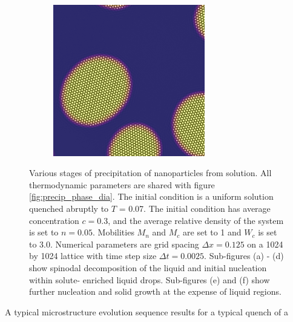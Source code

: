 \documentclass[showkeys, prb, reprint]{revtex4-1}
\begin{document}
\begin{figure}
\begin{subfigure}[b]{0.2\textwidth}
        \label{fig:sacrifical_growth}
        \caption{}
    \end{subfigure}
    ~ 
    \begin{subfigure}[b]{0.2\textwidth}
        \includegraphics[width=\textwidth]{crystalgrowth}
        \label{fig:crystalgrowth}
        \caption{}
    \end{subfigure}
    \caption{
        \label{fig:precipitation}
        Various stages of precipitation of nanoparticles from solution. All
        thermodynamic parameters are shared with figure
        \ref{fig:precip_phase_dia}. The initial condition is a uniform solution
        quenched abruptly to $T$ = 0.07. The initial condition has average
        concentration $c = 0.3$, and the average relative density of the system 
        is set to $n = 0.05$. Mobilities $M_n$ and $M_c$ are set to 1 and $W_c$ is set to 
        3.0. Numerical parameters are grid spacing $\Delta x = 0.125$ on a 1024 by
        1024 lattice with time step size $\Delta t = 0.0025$. Sub-figures (a) -
        (d) show spinodal decomposition of the liquid and initial nucleation within solute-	enriched liquid drops. Sub-figures (e) and (f) show further nucleation and solid 		growth at the expense of liquid regions.   
    }
\end{figure}
%
A typical microstructure evolution sequence results for a typical quench of a
\end{document}
